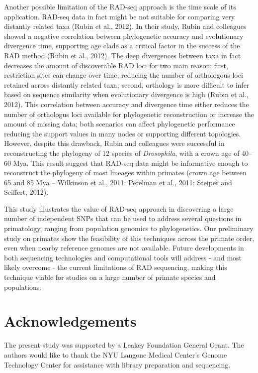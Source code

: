 \documentclass[12pt]{article}
\begin{document}
Another possible limitation of the RAD-seq approach is the time scale of its application. RAD-seq data in fact might be not suitable for comparing very distantly related taxa (Rubin et al., 2012). In their study, Rubin and colleagues showed a negative correlation between phylogenetic accuracy and evolutionary divergence time, supporting age clade as a critical factor in the success of the RAD method (Rubin et al., 2012). The deep divergences between taxa in fact decreases the amount of discoverable RAD loci for two main reason: first, restriction sites can change over time, reducing the number of orthologous loci retained across distantly related taxa; second, orthology is more difficult to infer based on sequence similarity when evolutionary divergence is high (Rubin et al., 2012). This correlation between accuracy and divergence time either reduces the number of orthologus loci available for phylogenetic reconstruction or increase the amount of missing data; both scenarios can affect phylogenetic performance reducing the support values in many nodes or supporting different topologies. However, despite this drawback, Rubin and colleagues were successful in reconstructing the phylogeny of 12 species of \emph{Drosophila}, with a crown age of 40–60 Mya. This result suggest that RAD-seq data might be informative enough to reconstruct the phylogeny of most lineages within primates (crown age between 65 and 85 Mya – Wilkinson et al., 2011; Perelman et al., 2011; Steiper and Seiffert, 2012).

This study illustrates the value of RAD-seq approach in discovering a large number of independent SNPs that can be used to address several questions in primatology, ranging from population genomics to phylogenetics. Our preliminary study on primates show the feasibility of this techniques across the primate order, even when nearby reference genomes are not available. Future developments in both sequencing technologies and computational tools will address - and most likely overcome - the current limitations of RAD sequencing, making this technique viable for studies on a large number of primate species and populations.

\section{Acknowledgements}

The present study was supported by a Leakey Foundation General Grant. The authors would like to thank the NYU Langone Medical Center's Genome Technology Center for assistance with library preparation and sequencing.
\end{document}
